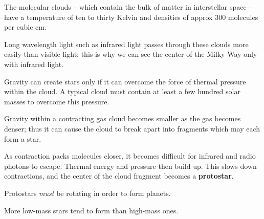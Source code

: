\documentclass[12pt]{article}
\begin{document}
The molecular clouds -- which contain the bulk of matter in interstellar space -- have a temperature of ten to thirty Kelvin and densities of approx 300 molecules per cubic cm.

Long wavelength light such as infrared light passes through these clouds more easily than visible light; this is why we can see the center of the Milky Way only with infrared light.

Gravity can create stars only if it can overcome the force of thermal pressure within the cloud. A typical cloud must contain at least a few hundred solar masses to overcome this pressure.

Gravity within a contracting gas cloud becomes smaller as the gas becomes denser; thus it can cause the cloud to break apart into fragments which may each form a star.

As contraction packs molecules closer, it becomes difficult for infrared and radio photons to escape. Thermal energy and pressure then build up. This slows down contractions, and the center of the cloud fragment becomes a {\bf protostar}.

Protostars \emph{must} be rotating in order to form planets.

More low-mass stars tend to form than high-mass ones.
\end{document}
